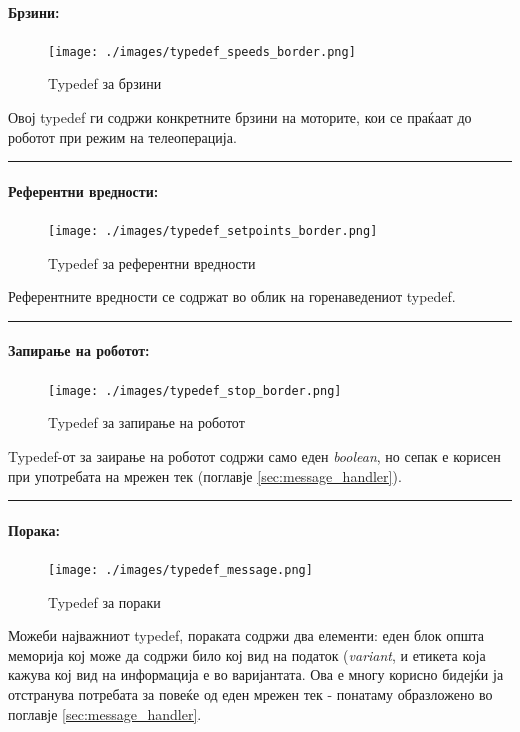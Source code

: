 \documentclass[11pt]{article}
\begin{document}
      \paragraph{Брзини:\\}
	      \begin{figure}[H]
          \centering
	        \texttt{[image: ./images/typedef\_speeds\_border.png]}
		      \caption{Typedef за брзини}
	        \label{fig:gain_typedef}
	        \end{figure}
	      Овој typedef ги содржи конкретните брзини на моторите, кои се праќаат до роботот при режим на телеоперација.\\
        \textcolor[RGB]{150,150,150}{\rule{\linewidth}{1.6pt}}

      \paragraph{Референтни вредности:\\}
	      \begin{figure}[H]
          \centering
	        \texttt{[image: ./images/typedef\_setpoints\_border.png]}
		      \caption{Typedef за референтни вредности}
	        \label{fig:setpoints_typedef}
	        \end{figure}
	      Референтните вредности се содржат во облик на горенаведениот typedef.\\
        \textcolor[RGB]{150,150,150}{\rule{\linewidth}{1.6pt}}

      \paragraph{Запирање на роботот:\\}
	      \begin{figure}[H]
          \centering
	        \texttt{[image: ./images/typedef\_stop\_border.png]}
		      \caption{Typedef за запирање на роботот}
	        \label{fig:setpoints_typedef}
	        \end{figure}
        Typedef-от за заирање на роботот содржи само еден \textit{boolean}, но сепак е корисен при употребата на мрежен тек (поглавје \ref{sec:message_handler}).\\
        \textcolor[RGB]{150,150,150}{\rule{\linewidth}{1.6pt}}

      \paragraph{Порака:\\}
        \begin{figure}[H]
          \centering
          \texttt{[image: ./images/typedef\_message.png]}
          \caption{Typedef за пораки}
          \label{fig:message_typedef}
          \end{figure}
        Можеби најважниот typedef, пораката содржи два елементи: еден блок општа меморија кој може да содржи било кој вид на податок (\textit{variant}, и етикета која кажува кој вид на информација е во варијантата. Ова е многу корисно бидејќи ја отстранува потребата за повеќе од еден мрежен тек - понатаму образложено во поглавје \ref{sec:message_handler}.
\end{document}

